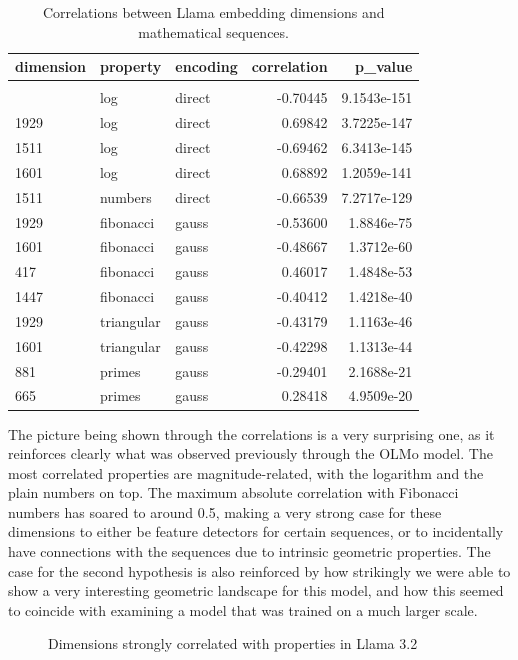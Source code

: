 \documentclass[
  a4paper, twoside, 10pt, titlepage]{book}
\begin{document}
\begin{longtable}[]{@{}lllrr@{}}
\toprule\noalign{}
dimension & property & encoding & correlation & p\_value \\
\midrule\noalign{}
\endhead
\bottomrule\noalign{}
\tabularnewline
\caption{Correlations between Llama embedding dimensions and
mathematical sequences.}
\endlastfoot
417 & log & direct & -0.70445 & 9.1543e-151 \\
1929 & log & direct & 0.69842 & 3.7225e-147 \\
1511 & log & direct & -0.69462 & 6.3413e-145 \\
1601 & log & direct & 0.68892 & 1.2059e-141 \\
1511 & numbers & direct & -0.66539 & 7.2717e-129 \\
1929 & fibonacci & gauss & -0.53600 & 1.8846e-75 \\
1601 & fibonacci & gauss & -0.48667 & 1.3712e-60 \\
417 & fibonacci & gauss & 0.46017 & 1.4848e-53 \\
1447 & fibonacci & gauss & -0.40412 & 1.4218e-40 \\
1929 & triangular & gauss & -0.43179 & 1.1163e-46 \\
1601 & triangular & gauss & -0.42298 & 1.1313e-44 \\
881 & primes & gauss & -0.29401 & 2.1688e-21 \\
665 & primes & gauss & 0.28418 & 4.9509e-20 \\
\end{longtable}

The picture being shown through the correlations is a very surprising
one, as it reinforces clearly what was observed previously through the
OLMo model. The most correlated properties are magnitude-related, with
the logarithm and the plain numbers on top. The maximum absolute
correlation with Fibonacci numbers has soared to around 0.5, making a
very strong case for these dimensions to either be feature detectors for
certain sequences, or to incidentally have connections with the
sequences due to intrinsic geometric properties. The case for the second
hypothesis is also reinforced by how strikingly we were able to show a
very interesting geometric landscape for this model, and how this seemed
to coincide with examining a model that was trained on a much larger
scale.

\begin{figure}
\centering

\caption{Dimensions strongly correlated with properties in Llama
3.2}\label{fig:llama-properties}
\end{figure}
\end{document}
